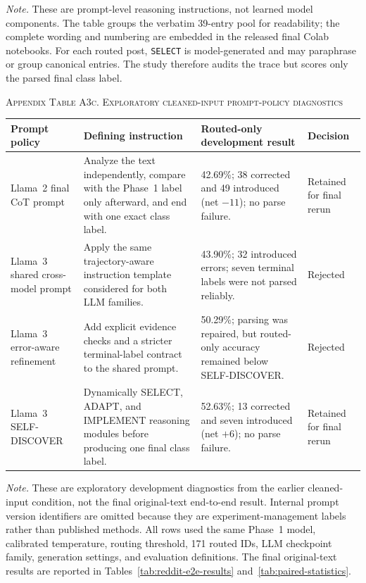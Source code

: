 \documentclass{ieeeaccess}
\begin{document}
\par\smallskip
\noindent\footnotesize\textit{Note.} These are prompt-level reasoning instructions, not learned model components. The table groups the verbatim 39-entry pool for readability; the complete wording and numbering are embedded in the released final Colab notebooks. For each routed post, \texttt{SELECT} is model-generated and may paraphrase or group canonical entries. The study therefore audits the trace but scores only the parsed final class label.\normalsize

\par\medskip
{}
\noindent\textsc{Appendix Table A3c. Exploratory cleaned-input prompt-policy diagnostics}\par
\label{tab:appendix-a3c-prompt-ablation}
\smallskip
\footnotesize
\setlength{\tabcolsep}{3pt}
\renewcommand{\arraystretch}{1.16}
\noindent\begin{tabularx}{\textwidth}{@{}>{\raggedright\arraybackslash}p{}>{\raggedright\arraybackslash}p{}Y>{\raggedright\arraybackslash}p{0.15\textwidth}@{}}
\toprule
Prompt policy & Defining instruction & Routed-only development result & Decision \\
\midrule
Llama~2 final CoT prompt & Analyze the text independently, compare with the Phase~1 label only afterward, and end with one exact class label. & 42.69\%; 38 corrected and 49 introduced (net $-11$); no parse failure. & Retained for final rerun \\
Llama~3 shared cross-model prompt & Apply the same trajectory-aware instruction template considered for both LLM families. & 43.90\%; 32 introduced errors; seven terminal labels were not parsed reliably. & Rejected \\
Llama~3 error-aware refinement & Add explicit evidence checks and a stricter terminal-label contract to the shared prompt. & 50.29\%; parsing was repaired, but routed-only accuracy remained below SELF-DISCOVER. & Rejected \\
Llama~3 SELF-DISCOVER & Dynamically SELECT, ADAPT, and IMPLEMENT reasoning modules before producing one final class label. & 52.63\%; 13 corrected and seven introduced (net $+6$); no parse failure. & Retained for final rerun \\
\bottomrule
\end{tabularx}
\par\smallskip
\noindent\footnotesize\textit{Note.} These are exploratory development diagnostics from the earlier cleaned-input condition, not the final original-text end-to-end result. Internal prompt version identifiers are omitted because they are experiment-management labels rather than published methods. All rows used the same Phase~1 model, calibrated temperature, routing threshold, 171 routed IDs, LLM checkpoint family, generation settings, and evaluation definitions. The final original-text results are reported in Tables~\ref{tab:reddit-e2e-results} and~\ref{tab:paired-statistics}.\normalsize
\par\medskip
\normalsize
\end{document}
